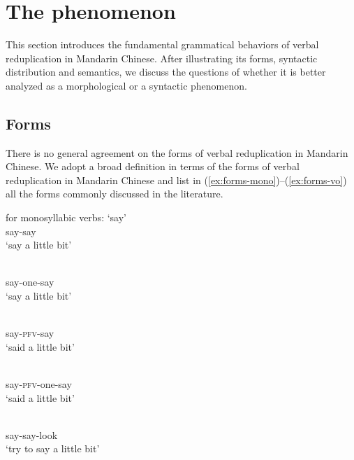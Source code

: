 \section{The phenomenon}\label{sec:phen}

This section introduces the fundamental grammatical behaviors of verbal reduplication in Mandarin Chinese.
 After illustrating its forms, syntactic distribution and semantics, 
 we discuss the questions of whether it is better analyzed as a morphological or a syntactic phenomenon.


\subsection{Forms}\label{sec:forms}

There is no general agreement on the forms of verbal reduplication in Mandarin Chinese.
We adopt a broad definition in terms of the forms of verbal reduplication in Mandarin Chinese 
and list in (\ref{ex:forms-mono})--(\ref{ex:forms-vo}) all the forms commonly discussed in the literature.

\settowidth{}

\ea\label{ex:forms-mono} for monosyllabic verbs:  `say'
	\ea \gll {}\\ 
		say-say\\ 
        \glt `say a little bit'
        
		\ex \gll {}\\
		say-one-say\\ 
        \glt `say a little bit'
        
		\ex \gll {}\\
		say-\textsc{pfv}-say\\ 
        \glt `said a little bit'
        
		\ex \gll {}\\
		say-\textsc{pfv}-one-say\\ 
        \glt `said a little bit'
        
		\ex \gll {}\\
		say-say-look\\ 
        \glt `try to say a little bit'
        
